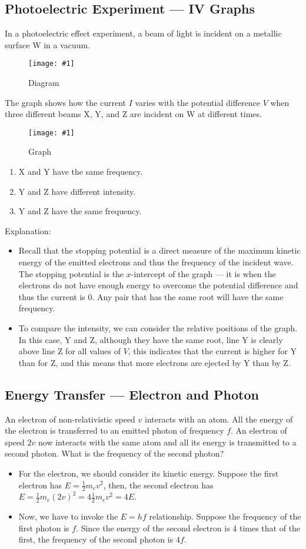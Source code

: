 \documentclass[a4paper,12pt]{article}
\newcommand{\img}[4]{\begin{center}
  \begin{figure}[H]
    \centering
    \texttt{[image: \#1]}
    \caption{#3}
    \label{fig:#4}
  \end{figure}
\end{center}}
\begin{document}
\pagebreak

\subsection{Photoelectric Experiment --- IV Graphs}

In a photoelectric effect experiment, a beam of light is incident on a metallic surface W in a vacuum.

\img{ex/pe.png}{0.4}{Diagram}{pe}
The graph shows how the current $I$ varies with the potential difference $V$ when three different beams X, Y, and Z are incident on W at different times.
\img{ex/pegraph.png}{0.5}{Graph}{pegraph}
\begin{enumerate}[label=\Roman*. ]
  \item X and Y have the same frequency.
  \item Y and Z have different intensity.
  \item Y and Z have the same frequency.
\end{enumerate}
Explanation:
\begin{itemize}
  \item Recall that the stopping potential is a direct measure of the maximum kinetic energy of the emitted electrons and thus the frequency of the incident wave. The stopping potential is the $x$-intercept of the graph --- it is when the electrons do not have enough energy to overcome the potential difference and thus the current is 0. Any pair that has the same root will have the same frequency.
  \item To compare the intensity, we can consider the relative positions of the graph. In this case, Y and Z, although they have the same root, line Y is clearly above line Z for all values of $V$, this indicates that the current is higher for Y than for Z, and this means that more electrons are ejected by Y than by Z.
\end{itemize}

\pagebreak

\subsection{Energy Transfer --- Electron and Photon}

An electron of non-relativistic speed $v$ interacts with an atom. All the energy of the electron is transferred to an emitted photon of frequency $f$. An electron of speed $2v$ now interacts with the same atom and all its energy is transmitted to a second photon. What is the frequency of the second photon?
\begin{itemize}
  \item For the electron, we should consider its kinetic energy. Suppose the first electron has $E = \frac{1}{2}m_ev^2$, then, the second electron has $E = \frac{1}{2}m_e(2v)^2 = 4\frac{1}{2}m_ev^2 = 4E$.
  \item Now, we have to invoke the $E = hf$ relationship. Suppose the frequency of the first photon is $f$. Since the energy of the second electron is 4 times that of the first, the frequency of the second photon is $4f$.
\end{itemize}
\end{document}

